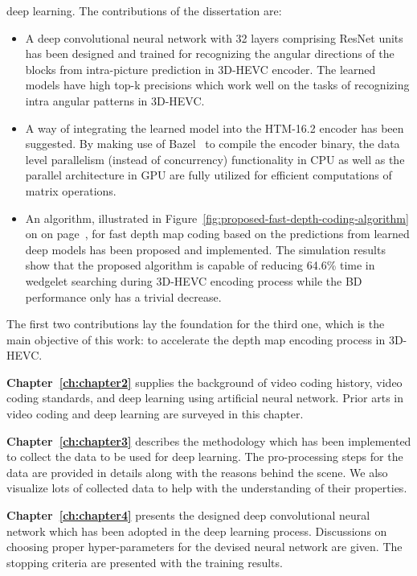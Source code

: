 deep learning.
The contributions of the dissertation are:
\begin{itemize}
  \item A deep convolutional neural network with 32 layers comprising ResNet
  units~\parencite{RN67} has been designed and trained for recognizing the
  angular directions of the blocks from intra-picture prediction in 3D-HEVC
  encoder.
  The learned models have high top-k precisions which work well on the
  tasks of recognizing intra angular patterns in 3D-HEVC.
  \item A way of integrating the learned model into the HTM-16.2 encoder has
  been suggested.
  By making use of Bazel~\parencite{RN200} to compile the encoder binary, the
  data level parallelism (instead of concurrency) functionality in CPU
  as well as the parallel architecture in GPU are fully utilized for
  efficient computations of matrix operations.
  \item An algorithm, illustrated in
  Figure~\ref{fig:proposed-fast-depth-coding-algorithm} on on
  page~\pageref{fig:proposed-fast-depth-coding-algorithm}, for fast
  depth map coding based
  on the predictions from
  learned deep models has been proposed and implemented.
  The simulation results show that the proposed algorithm is capable of
  reducing 64.6\% time in wedgelet searching during 3D-HEVC encoding process
  while the BD performance only has a trivial decrease.
\end{itemize}
The first two contributions lay the foundation for the third one, which is the
main objective of this work: to accelerate the depth map encoding process in
3D-HEVC.

\textbf{Chapter~\ref{ch:chapter2}} supplies the background of video
coding history, video coding standards, and deep learning using artificial
neural network.
Prior arts in video coding and deep learning are surveyed in this chapter.

\textbf{Chapter~\ref{ch:chapter3}} describes the methodology which has been
implemented to collect the data to be used for deep learning.
The pro-processing steps for the data are provided in details along with
the reasons behind the scene.
We also visualize lots of collected data to help with the understanding of
their properties.

\textbf{Chapter~\ref{ch:chapter4}} presents the designed deep convolutional
neural network which has been adopted in the deep learning process.
Discussions on choosing proper hyper-parameters for the devised neural network
are given.
The stopping criteria are presented with the training results.

